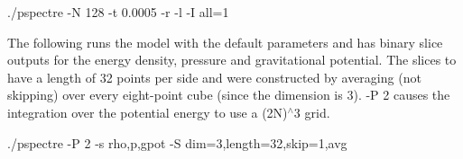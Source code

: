 \begin{DoxyCode}
 ./pspectre -N 128 -t 0.0005 -r -l -I all=1
\end{DoxyCode}


The following runs the model with the default parameters and has binary slice outputs for the energy density, pressure and gravitational potential. The slices to have a length of 32 points per side and were constructed by averaging (not skipping) over every eight-\/point cube (since the dimension is 3). -\/P 2 causes the integration over the potential energy to use a (2N)$^\wedge$3 grid.


\begin{DoxyCode}
 ./pspectre -P 2 -s rho,p,gpot -S dim=3,length=32,skip=1,avg
\end{DoxyCode}
 